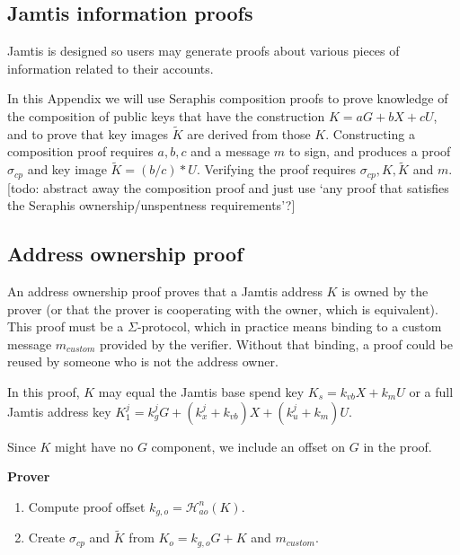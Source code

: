 \begin{appendices}

\renewcommand{\theFancyVerbLine}{%
	\textcolor{red}{\small
		\arabic{FancyVerbLine}}}

\section{Jamtis information proofs}
\label{appendix:jamtis-information-proofs}

Jamtis is designed so users may generate proofs about various pieces of information related to their accounts.

In this Appendix we will use Seraphis composition proofs \cite{seraphis} to prove knowledge of the composition of public keys that have the construction $K = a G + b X + c U$, and to prove that key images $\tilde{K}$ are derived from those $K$. Constructing a composition proof requires $a, b, c$ and a message $m$ to sign, and produces a proof $\sigma_{cp}$ and key image $\tilde{K} = (b/c)*U$. Verifying the proof requires $\sigma_{cp}, K, \tilde{K}$ and $m$. [todo: abstract away the composition proof and just use `any proof that satisfies the Seraphis ownership/unspentness requirements'?]


\subsection{Address ownership proof}
\label{appendix:jamtis-information-proofs-address-ownership}

An address ownership proof proves that a Jamtis address $K$ is owned by the prover (or that the prover is cooperating with the owner, which is equivalent). This proof must be a $\Sigma$-protocol, which in practice means binding to a custom message $m_{custom}$ provided by the verifier. Without that binding, a proof could be reused by someone who is not the address owner.

In this proof, $K$ may equal the Jamtis base spend key $K_s = k_{vb} X + k_m U$ or a full Jamtis address key $K^j_1 = k^j_g G + (k^j_x + k_{vb}) X + (k^j_u + k_m) U$.

Since $K$ might have no $G$ component, we include an offset on $G$ in the proof.

\textbf{Prover}

\begin{enumerate}
    \item Compute proof offset $k_{g, o} = \mathcal{H}^n_{ao}(K)$.
    \item Create $\sigma_{cp}$ and $\tilde{K}$ from $K_o = k_{g, o} G + K$ and $m_{custom}$.
\end{enumerate}


\end{appendices}
